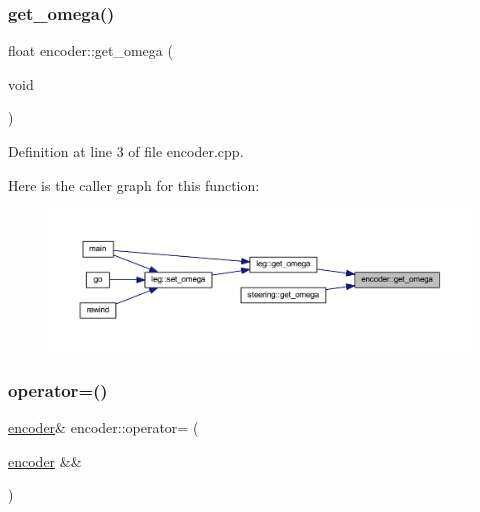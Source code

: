 \subsubsection{\texorpdfstring{get\_omega()}{get\_omega()}}
{\footnotesize\ttfamily float encoder\+::get\+\_\+omega (\begin{DoxyParamCaption}\item[{void}]{ }\end{DoxyParamCaption})}



Definition at line 3 of file encoder.\+cpp.

Here is the caller graph for this function\+:
\nopagebreak
\begin{figure}[H]
\begin{center}
\leavevmode
\includegraphics[width=350pt]{classencoder_a9be6cc4f517fdc88970eb5d39e52f5c8_icgraph}
\end{center}
\end{figure}
\mbox{\label{classencoder_a2e2784d15f3f7e13aecde2ead7a43a68}} 
\subsubsection{\texorpdfstring{operator=()}{operator=()}\hspace{0.1cm}{\footnotesize\ttfamily [1/2]}}
{\footnotesize\ttfamily \mbox{\hyperlink{classencoder}{encoder}}\& encoder\+::operator= (\begin{DoxyParamCaption}\item[{\mbox{\hyperlink{classencoder}{encoder}} \&\&}]{ }\end{DoxyParamCaption})\hspace{0.3cm}{\ttfamily [default]}}

\mbox{\label{classencoder_a9916948157fd30beeaf0fb141c356e2d}} 
